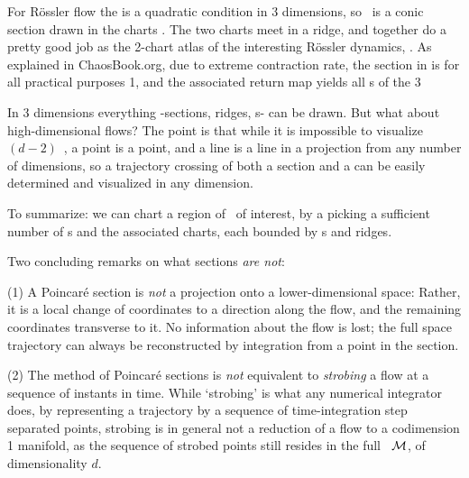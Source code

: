 
For R\"ossler flow  the  is a
quadratic condition in 3 dimensions, so \poincBord\ is a conic section
drawn in the charts . The two
charts meet in a ridge, and together do a pretty good job as the 2-chart
atlas of the interesting R\"ossler dynamics, . As
explained in ChaosBook.org, due to extreme contraction rate, the section
in  is for all practical purposes 1\dmn, and the
associated return map yields all \po s of the 3\dmn\

In 3 dimensions everything -sections, ridges, \poincBord s-  can be
drawn. But what about high-dimensional flows? The point is that while it
is impossible to visualize  $(d\!-\!2)$\dmn\ {\poincBord}, a point is a
point, and a line is a line in a projection from any number of
dimensions, so a trajectory crossing of both a section and a {\poincBord}
can be easily determined and visualized in any dimension.


To summarize: we can chart a region of \statesp\ of interest, by a
picking a sufficient number of \template s and the associated charts,
each bounded by \poincBord s and ridges.

Two concluding remarks on what sections \emph{are not}:

(1) A Poincar\'e section is {\em not} a projection onto a
lower-dimensional space: Rather, it is a local change of coordinates to a
direction along the flow, and the remaining coordinates transverse to it.
No information about the flow is lost; the full space trajectory can
always be reconstructed by integration from a point in the section.

(2) The method of Poincar\'e sections is {\em not} equivalent to
\emph{strobing} a flow at a sequence of instants in time. While
`strobing' is what any numerical integrator does, by representing a
trajectory by a sequence of time-integration step separated points,
strobing is in general not a reduction of a flow to a codimension 1
manifold, as the sequence of strobed points still resides in the full
\statesp\ ${\cal M}$, of dimensionality $d$.
